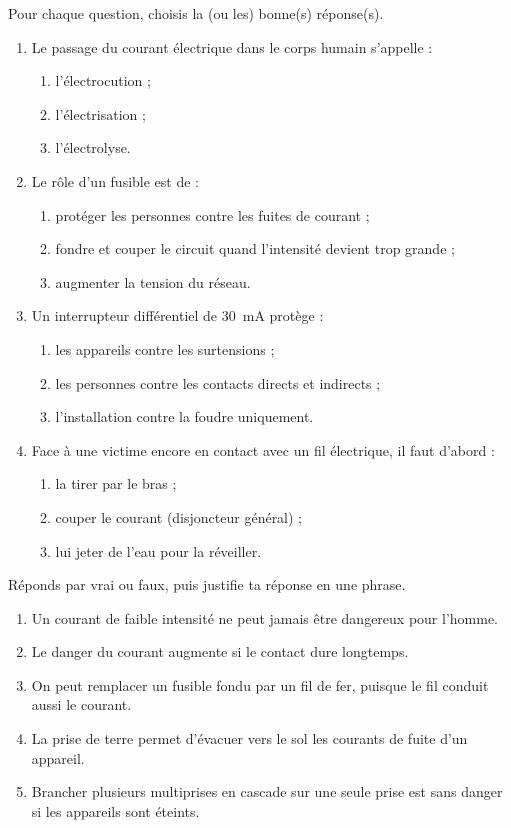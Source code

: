 \documentclass[11pt]{article}
\begin{document}
\begin{exercice}
Pour chaque question, choisis la (ou les) bonne(s) réponse(s).
\begin{enumerate}
\item Le passage du courant électrique dans le corps humain s'appelle :
\begin{enumerate}
\item l'électrocution ;
\item l'électrisation ;
\item l'électrolyse.
\end{enumerate}
\item Le rôle d'un fusible est de :
\begin{enumerate}
\item protéger les personnes contre les fuites de courant ;
\item fondre et couper le circuit quand l'intensité devient trop grande ;
\item augmenter la tension du réseau.
\end{enumerate}
\item Un interrupteur différentiel de \SI{30}{mA} protège :
\begin{enumerate}
\item les appareils contre les surtensions ;
\item les personnes contre les contacts directs et indirects ;
\item l'installation contre la foudre uniquement.
\end{enumerate}
\item Face à une victime encore en contact avec un fil électrique, il faut d'abord :
\begin{enumerate}
\item la tirer par le bras ;
\item couper le courant (disjoncteur général) ;
\item lui jeter de l'eau pour la réveiller.
\end{enumerate}
\end{enumerate}
\end{exercice}

\begin{exercice}
Réponds par vrai ou faux, puis justifie ta réponse en une phrase.
\begin{enumerate}
\item Un courant de faible intensité ne peut jamais être dangereux pour l'homme.
\item Le danger du courant augmente si le contact dure longtemps.
\item On peut remplacer un fusible fondu par un fil de fer, puisque le fil conduit aussi le courant.
\item La prise de terre permet d'évacuer vers le sol les courants de fuite d'un appareil.
\item Brancher plusieurs multiprises en cascade sur une seule prise est sans danger si les appareils sont éteints.
\end{enumerate}
\end{exercice}
\end{document}
